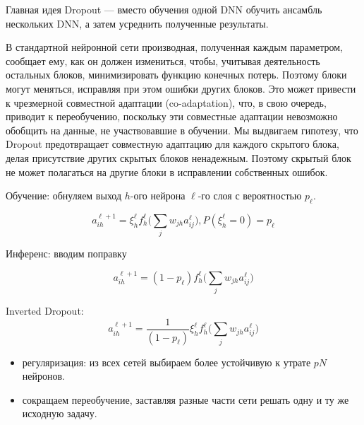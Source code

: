 \documentclass[11pt, oneside]{article}   	%
\begin{document}
	Главная идея Dropout — вместо обучения одной DNN обучить ансамбль нескольких DNN, а затем усреднить полученные результаты.
	\begin{figure}[h]
	\end{figure}
	В стандартной нейронной сети производная, полученная каждым параметром, сообщает ему, как он должен измениться, чтобы, учитывая деятельность остальных блоков, минимизировать функцию конечных потерь. Поэтому блоки могут меняться, исправляя при этом ошибки других блоков. Это может привести к чрезмерной совместной адаптации (co-adaptation), что, в свою очередь, приводит к переобучению, поскольку эти совместные адаптации невозможно обобщить на данные, не участвовавшие в обучении. Мы выдвигаем гипотезу, что Dropout предотвращает совместную адаптацию для каждого скрытого блока, делая присутствие других скрытых блоков ненадежным. Поэтому скрытый блок не может полагаться на другие блоки в исправлении собственных ошибок.
	
	Обучение: обнуляем выход $h$-ого нейрона $\ell$-го слоя с вероятностью $p_\ell$.
	
	$$a^{\ell+1}_{ih} = \xi^{\ell}_h f_h^{\ell}\big( \sum\limits_{j} w_{jh}a_{ij}^{\ell} \big), P(\xi^{\ell}_h = 0) = p_\ell$$
	
	Инференс: вводим поправку
	
	$$a^{\ell+1}_{ih} = (1 - p_{\ell}) f_h^{\ell}\big( \sum\limits_{j} w_{jh}a_{ij}^{\ell} \big)$$
	
	
	Inverted Dropout: $$a^{\ell+1}_{ih} = \dfrac{1}{(1 - p_{\ell})} \xi^{\ell}_h f_h^{\ell}\big( \sum\limits_{j} w_{jh}a_{ij}^{\ell} \big)$$
	
	\begin{itemize}
		\item регуляризация: из всех сетей выбираем  более устойчивую к утрате $pN$ нейронов.
		\item сокращаем переобучение, заставляя разные части сети решать одну и ту же исходную задачу. 
	\end{itemize}
	
\end{document}
